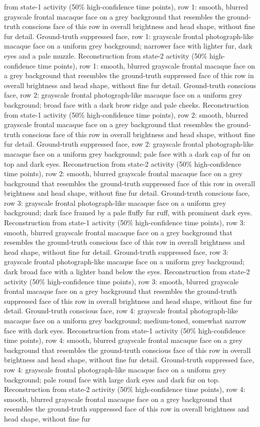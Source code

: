 \documentclass{article}
\begin{document}
from state-1 activity (50\% high-confidence time points), row 1: smooth, blurred grayscale frontal macaque face on a grey background that resembles the ground-truth conscious face of this row in overall brightness and head shape, without fine fur detail. Ground-truth suppressed face, row 1: grayscale frontal photograph-like macaque face on a uniform grey background; narrower face with lighter fur, dark eyes and a pale muzzle. Reconstruction from state-2 activity (50\% high-confidence time points), row 1: smooth, blurred grayscale frontal macaque face on a grey background that resembles the ground-truth suppressed face of this row in overall brightness and head shape, without fine fur detail. Ground-truth conscious face, row 2: grayscale frontal photograph-like macaque face on a uniform grey background; broad face with a dark brow ridge and pale cheeks. Reconstruction from state-1 activity (50\% high-confidence time points), row 2: smooth, blurred grayscale frontal macaque face on a grey background that resembles the ground-truth conscious face of this row in overall brightness and head shape, without fine fur detail. Ground-truth suppressed face, row 2: grayscale frontal photograph-like macaque face on a uniform grey background; pale face with a dark cap of fur on top and dark eyes. Reconstruction from state-2 activity (50\% high-confidence time points), row 2: smooth, blurred grayscale frontal macaque face on a grey background that resembles the ground-truth suppressed face of this row in overall brightness and head shape, without fine fur detail. Ground-truth conscious face, row 3: grayscale frontal photograph-like macaque face on a uniform grey background; dark face framed by a pale fluffy fur ruff, with prominent dark eyes. Reconstruction from state-1 activity (50\% high-confidence time points), row 3: smooth, blurred grayscale frontal macaque face on a grey background that resembles the ground-truth conscious face of this row in overall brightness and head shape, without fine fur detail. Ground-truth suppressed face, row 3: grayscale frontal photograph-like macaque face on a uniform grey background; dark broad face with a lighter band below the eyes. Reconstruction from state-2 activity (50\% high-confidence time points), row 3: smooth, blurred grayscale frontal macaque face on a grey background that resembles the ground-truth suppressed face of this row in overall brightness and head shape, without fine fur detail. Ground-truth conscious face, row 4: grayscale frontal photograph-like macaque face on a uniform grey background; medium-toned, somewhat narrow face with dark eyes. Reconstruction from state-1 activity (50\% high-confidence time points), row 4: smooth, blurred grayscale frontal macaque face on a grey background that resembles the ground-truth conscious face of this row in overall brightness and head shape, without fine fur detail. Ground-truth suppressed face, row 4: grayscale frontal photograph-like macaque face on a uniform grey background; pale round face with large dark eyes and dark fur on top. Reconstruction from state-2 activity (50\% high-confidence time points), row 4: smooth, blurred grayscale frontal macaque face on a grey background that resembles the ground-truth suppressed face of this row in overall brightness and head shape, without fine fur 
\end{document}
